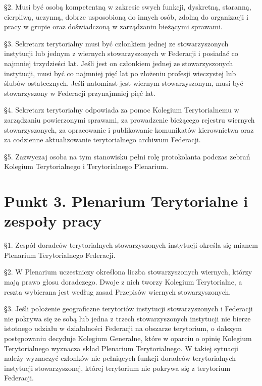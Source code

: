 \S{}2. Musi być osobą kompetentną w zakresie swych funkcji, dyskretną, staranną, cierpliwą, uczynną, dobrze usposobioną do innych osób, zdolną do organizacji i pracy w grupie oraz doświadczoną w zarządzaniu bieżącymi sprawami.

\S{}3. Sekretarz terytorialny musi być członkiem jednej ze stowarzyszonych instytucji lub jednym z wiernych stowarzyszonych w Federacji i posiadać co najmniej trzydzieści lat. Jeśli jest on członkiem jednej ze stowarzyszonych instytucji, musi być co najmniej pięć lat po złożeniu profesji wieczystej lub ślubów ostatecznych. Jeśli natomiast jest wiernym stowarzyszonym, musi być stowarzyszony w Federacji przynajmniej pięć lat.

\S{}4. Sekretarz terytorialny odpowiada za pomoc Kolegium Terytorialnemu w zarządzaniu powierzonymi sprawami, za prowadzenie bieżącego rejestru wiernych stowarzyszonych, za opracowanie i publikowanie komunikatów kierownictwa oraz za codzienne aktualizowanie terytorialnego archiwum Federacji.

\S{}5. Zazwyczaj osoba na tym stanowisku pełni rolę protokolanta podczas zebrań Kolegium Terytorialnego i Terytorialnego Plenarium.


\section{Punkt 3. Plenarium Terytorialne i zespoły pracy}


 \S{}1. Zespół doradców terytorialnych stowarzyszonych instytucji określa się mianem Plenarium Terytorialnego Federacji.

\S{}2. W Plenarium uczestniczy określona liczba stowarzyszonych wiernych, którzy mają prawo głosu doradczego. Dwoje z nich tworzy Kolegium Terytorialne, a reszta wybierana jest według zasad Przepisów wiernych stowarzyszonych.

\S{}3. Jeśli położenie geograficzne terytoriów instytucji stowarzyszonych i Federacji nie pokrywa się ze sobą lub jedna z trzech stowarzyszonych instytucji nie bierze istotnego udziału w działalności Federacji na obszarze terytorium, o dalszym postępowaniu decyduje Kolegium Generalne, które w oparciu o opinię Kolegium Terytorialnego wyznacza skład Plenarium Terytorialnego. W takiej sytuacji należy wyznaczyć członków nie pełniących funkcji doradców terytorialnych instytucji stowarzyszonej, której terytorium nie pokrywa się z terytorium Federacji.


